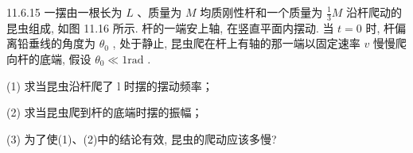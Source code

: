 \begin{problem}{11.6.15}
一摆由一根长为 $L$ 、质量为 $M$ 均质刚性杆和一个质量为 $\frac{1}{3} M$ 沿杆爬动的昆虫组成, 如图 11.16 所示. 杆的一端安上轴, 在竖直平面内摆动. 当 $t = 0$ 时, 杆偏离铅垂线的角度为 $\theta_0$ , 处于静止, 昆虫爬在杆上有轴的那一端以固定速率 $v$ 慢慢爬向杆的底端, 假设 $\theta_0 \ll 1\mathrm{rad}$ .

(1) 求当昆虫沿杆爬了 l 时摆的摆动频率；

(2) 求当昆虫爬到杆的底端时摆的振幅；

(3) 为了使(1)、(2)中的结论有效, 昆虫的爬动应该多慢?
\begin{center}

\end{center}
\end{problem}
\clearpage

